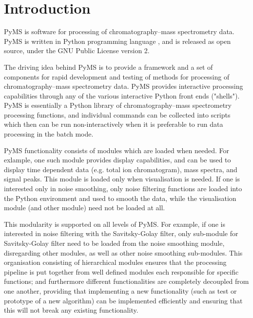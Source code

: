 

\chapter{Introduction}

PyMS is software for processing of chromatography--mass spectrometry data.
PyMS is written in Python programming language \cite{python}, and is
released as open source, under the GNU Public License version 2.

The driving idea behind PyMS is to provide a framework and a set of
components for rapid development and testing of methods for processing
of chromatography--mass spectrometry data. PyMS provides interactive
processing capabilities through any of the various interactive Python
front ends ("shells"). PyMS is essentially a Python library of
chromatography--mass spectrometry processing functions, and individual
commands can be collected into scripts which then can be run
non-interactively when it is preferable to run data processing in
the batch mode.

PyMS functionality consists of modules which are loaded when needed. 
For exlample, one such module provides display capabilities, and can
be used to display time dependent data (e.g. total ion chromatogram),
mass spectra, and signal peaks. This module is loaded only when
visualisation is needed. If one is interested only in noise smoothing,
only noise filtering functions are loaded into the Python environment
and used to smooth the data, while the visualisation module (and other
module) need not be loaded at all.

This modularity is supported on all levels of PyMS. For example, if
one is interested in noise filtering with the Savitsky-Golay filter,
only sub-module for Savitsky-Golay filter need to be loaded from
the noise smoothing module, disregarding other modules, as well
as other noise smoothing sub-modules. This organisation consisting
of hierarchical modules ensures that the processing pipeline is
put together from well defined modules each responsible for specific
functions; and furthermore different functionalities are completely
decoupled from one another, providing that implementing a new
functionality (such as test or prototype of a new algorithm) can
be implemented efficiently and ensuring that this will not break
any existing functionality.

